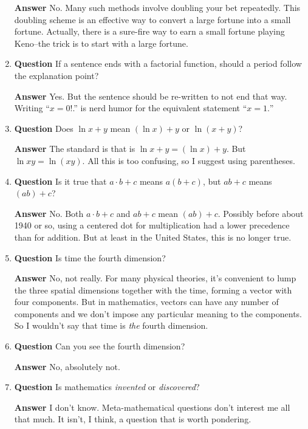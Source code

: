 \documentclass[12pt]{article}
\newcounter{ex}\setcounter{ex}{0}
\newcounter{cd}\setcounter{cd}{24}
\begin{document}
\begin{enumerate}
 \textbf{Answer} No. Many such methods involve doubling your bet repeatedly. This doubling scheme is 
an effective way to convert  a large fortune into a small fortune. Actually, there is a sure-fire 
way to earn a small fortune playing Keno--the trick is to start with a 
large fortune.

\item  \textbf{Question}  If a sentence ends with a factorial function, should a period follow the explanation point?

  \textbf{Answer}  Yes. But the sentence should be re-written to not end that way.  Writing ``\(x = 0!\).''  is nerd humor for the equivalent statement ``\(x = 1.\)''

\item  \textbf{Question} Does \(\ln x + y\) mean \((\ln x) + y \) or   \(\ln  (x + y)\)?

 \textbf{Answer} The standard is that is \(\ln x + y = (\ln x) + y \). But \( \ln x y = \ln(xy)\).  All this is too confusing, so I suggest using parentheses. 

\item  \textbf{Question}  Is it true that \(a \cdot b  + c\) means \(a (b+c)\), but \(a  b  + c\) means \((ab) + c\)?

 \textbf{Answer} No.  Both  \(a \cdot b  + c\) and \(a b + c\) mean  \((ab) + c\).  Possibly before about 1940 or so, using a centered dot for multiplication had a lower precedence than for addition. But at least in the United States, this is no longer true.



\item  \textbf{Question}  Is time the fourth dimension?

\textbf{Answer} No, not really.  For many physical theories, it's convenient to lump the three spatial dimensions together with the time, forming a vector with four components. But in mathematics, 
vectors can have any number of components and we don't impose any particular meaning to the components. So I wouldn't say that time is \emph{the} fourth dimension.

\item  \textbf{Question}  Can you see the fourth dimension?

\textbf{Answer} No, absolutely not.

\item  \textbf{Question}  Is mathematics \emph{invented} or \emph{discovered}?

 \textbf{Answer} I don't know. Meta-mathematical questions don't interest me all that much. 
It isn't, I think, a question that is worth pondering.


\end{enumerate}
\end{document}
